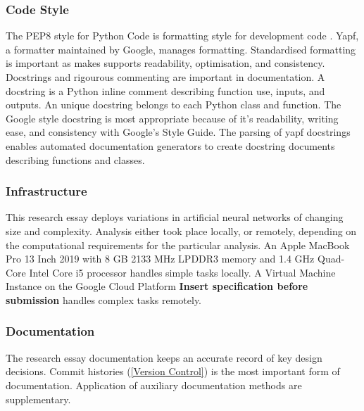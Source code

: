 \documentclass[10pt]{article}
\begin{document}
\subsubsection{Code Style} \label{CS}
The PEP8 style for Python Code is formatting style for development code \cite{PEP8}. 
Yapf, a formatter maintained by Google, manages formatting.
Standardised formatting is important as makes supports readability, optimisation, and consistency.
Docstrings and rigourous commenting are important in documentation. 
A docstring is a Python inline comment describing function use, inputs, and outputs.
An unique docstring belongs to each Python class and function. 
The Google style docstring is most appropriate because of it's readability, writing ease, and consistency with Google's Style Guide.
The parsing of yapf docstrings enables automated documentation generators to create docstring documents describing functions and classes.

\subsubsection{Infrastructure}
This research essay deploys variations in artificial neural networks of changing size and complexity.
Analysis either took place locally, or remotely, depending on the computational requirements for the particular analysis.
An Apple MacBook Pro 13 Inch 2019 with 8 GB 2133 MHz LPDDR3 memory and 1.4 GHz Quad-Core Intel Core i5 processor handles simple tasks locally.
A Virtual Machine Instance on the Google Cloud Platform \textbf{Insert specification before submission} handles complex tasks remotely.

\subsubsection{Documentation}
The research essay documentation keeps an accurate record of key design decisions.
Commit histories (\ref{Version Control}) is the most important form of documentation.
Application of auxiliary documentation methods are supplementary.
\end{document}
